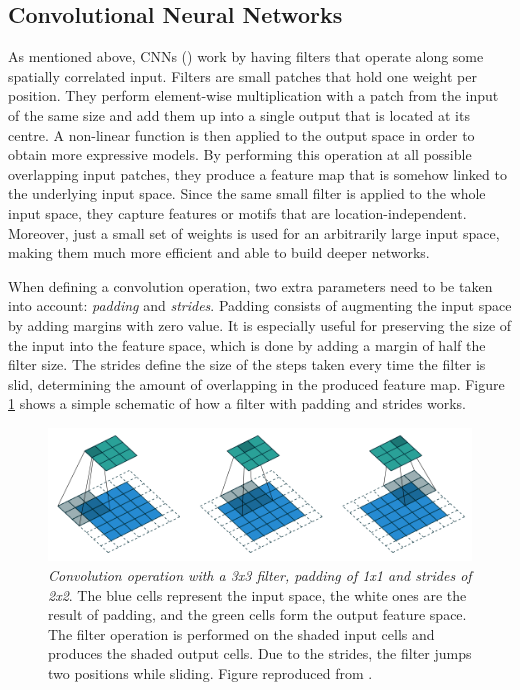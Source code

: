 \subsection{Convolutional Neural Networks} \label{sect:cnn}
As mentioned above, CNNs (\cite{LeCun1998}) work by having filters that operate along some spatially correlated input. Filters are small patches that hold one weight per position. They perform element-wise multiplication with a patch from the input of the same size and add them up into a single output that is located at its centre. A non-linear function is then applied to the output space in order to obtain more expressive models. By performing this operation at all possible overlapping input patches, they produce a feature map that is somehow linked to the underlying input space. Since the same small filter is applied to the whole input space, they capture features or motifs that are location-independent. Moreover, just a small set of weights is used for an arbitrarily large input space, making them much more efficient and able to build deeper networks.

When defining a convolution operation, two extra parameters need to be taken into account: \textit{padding} and \textit{strides}. Padding consists of augmenting the input space by adding margins with zero value. It is especially useful for preserving the size of the input into the feature space, which is done by adding a margin of half the filter size. The strides define the size of the steps taken every time the filter is slid, determining the amount of overlapping in the produced feature map. Figure \ref{fig:padding} shows a simple schematic of how a filter with padding and strides works.

\begin{figure}
	\centering
	\includegraphics[width=0.8\linewidth]{Figures/padding}
	\caption{\textit{Convolution operation with a 3x3 filter, padding of 1x1 and strides of 2x2}. The blue cells represent the input space, the white ones are the result of padding, and the green cells form the output feature space. The filter operation is performed on the shaded input cells and produces the shaded output cells. Due to the strides, the filter jumps two positions while sliding. Figure reproduced from \cite{Dumoulin2016}.}
	\label{fig:padding}
\end{figure}

